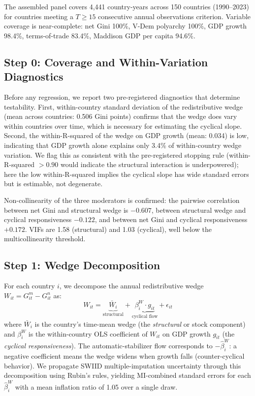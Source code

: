 \documentclass[11pt,letterpaper]{article}
\begin{document}
The assembled panel covers 4,441 country-years across 150 countries (1990--2023) for countries meeting a $T \geq 15$ consecutive annual observations criterion. Variable coverage is near-complete: net Gini 100\%, V-Dem polyarchy 100\%, GDP growth 98.4\%, terms-of-trade 83.4\%, Maddison GDP per capita 94.6\%.

\subsection{Step 0: Coverage and Within-Variation Diagnostics}

Before any regression, we report two pre-registered diagnostics that determine testability. First, within-country standard deviation of the redistributive wedge (mean across countries: 0.506 Gini points) confirms that the wedge does vary within countries over time, which is necessary for estimating the cyclical slope. Second, the within-R-squared of the wedge on GDP growth (mean: 0.034) is low, indicating that GDP growth alone explains only 3.4\% of within-country wedge variation. We flag this as consistent with the pre-registered stopping rule (within-R-squared $> 0.90$ would indicate the structural interaction is underpowered); here the low within-R-squared implies the cyclical slope has wide standard errors but is estimable, not degenerate.

Non-collinearity of the three moderators is confirmed: the pairwise correlation between net Gini and structural wedge is $-0.607$, between structural wedge and cyclical responsiveness $-0.122$, and between net Gini and cyclical responsiveness $+0.172$. VIFs are 1.58 (structural) and 1.03 (cyclical), well below the multicollinearity threshold.

\subsection{Step 1: Wedge Decomposition}

For each country $i$, we decompose the annual redistributive wedge $W_{it} = G^m_{it} - G^n_{it}$ as:
\begin{equation}
W_{it} = \underbrace{\bar{W}_i}_{\text{structural}} + \underbrace{\beta_i^W \cdot g_{it}}_{\text{cyclical flow}} + \epsilon_{it}
\end{equation}
where $\bar{W}_i$ is the country's time-mean wedge (the \emph{structural} or stock component) and $\beta_i^W$ is the within-country OLS coefficient of $W_{it}$ on GDP growth $g_{it}$ (the \emph{cyclical responsiveness}). The automatic-stabilizer flow corresponds to $-\hat{\beta}_i^W$: a negative coefficient means the wedge widens when growth falls (counter-cyclical behavior). We propagate SWIID multiple-imputation uncertainty through this decomposition using Rubin's rules, yielding MI-combined standard errors for each $\hat{\beta}_i^W$ with a mean inflation ratio of 1.05 over a single draw.
\end{document}
